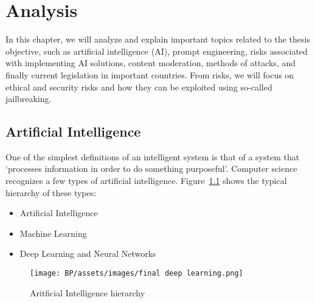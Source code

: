 \chapter{Analysis}

In this chapter, we will analyze and explain important topics related to the thesis objective, such as artificial intelligence (AI), prompt engineering, risks associated with implementing AI solutions, content moderation, methods of attacks, and finally current legislation in important countries. From risks, we will focus on ethical and security risks and how they can be exploited using so-called jailbreaking.

\section{Artificial Intelligence} %
One of the simplest definitions of an intelligent system is that of a system
that ‘processes information in order to do something purposeful’\cite{Dignum_2019}.
Computer science recognizes a few types of artificial intelligence. Figure~\ref{fig:AI-ML-DL-NN} shows the typical hierarchy of these types:

\begin{itemize}
    \item Artificial Intelligence
    \item Machine Learning
    \item Deep Learning and Neural Networks
\end{itemize}

\begin{figure}[h]
\begin{centering}
\texttt{[image: BP/assets/images/final deep learning.png]}
\par\end{centering}
\caption{Aritficial Intelligence hierarchy\cite{ai_hierarchy_pic}
\label{fig:AI-ML-DL-NN}}
\end{figure}


